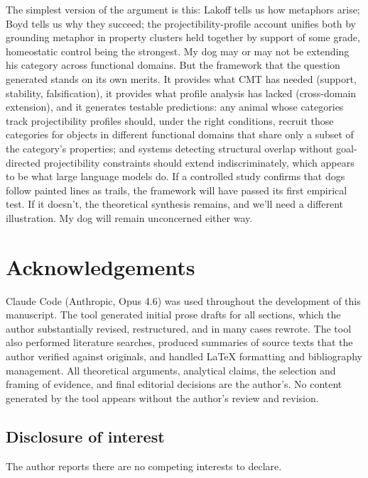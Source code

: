 \documentclass[12pt]{article}
\begin{document}
The simplest version of the argument is this: Lakoff tells us how metaphors arise; Boyd tells us why they succeed; the projectibility-profile account unifies both by grounding metaphor in property clusters held together by support of some grade, homeostatic control being the strongest. My dog may or may not be extending his  category across functional domains. But the framework that the question generated stands on its own merits. It provides what CMT has needed (support, stability, falsification), it provides what profile analysis has lacked (cross-domain extension), and it generates testable predictions: any animal whose categories track projectibility profiles should, under the right conditions, recruit those categories for objects in different functional domains that share only a subset of the category's properties; and systems detecting structural overlap without goal-directed projectibility constraints should extend indiscriminately, which appears to be what large language models do. If a controlled study confirms that dogs follow painted lines as trails, the framework will have passed its first empirical test. If it doesn't, the theoretical synthesis remains, and we'll need a different illustration. My dog will remain unconcerned either way.

\bigskip
\section*{Acknowledgements}

Claude Code (Anthropic, Opus 4.6) was used throughout the development of this manuscript. The tool generated initial prose drafts for all sections, which the author substantially revised, restructured, and in many cases rewrote. The tool also performed literature searches, produced summaries of source texts that the author verified against originals, and handled LaTeX formatting and bibliography management. All theoretical arguments, analytical claims, the selection and framing of evidence, and final editorial decisions are the author's. No content generated by the tool appears without the author's review and revision.

\subsection*{Disclosure of interest}

The author reports there are no competing interests to declare.

\newpage
\printbibliography
\end{document}
